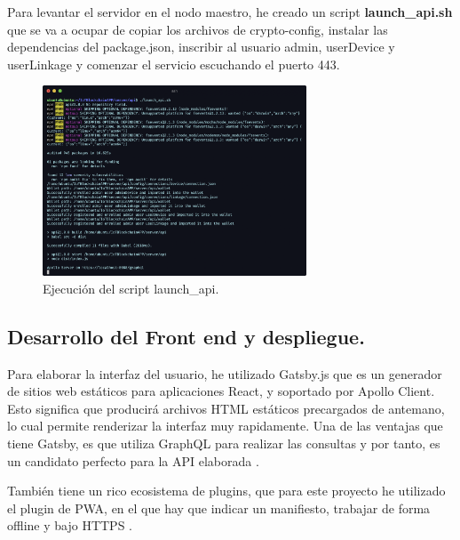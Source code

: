 \vspace{5mm}

\noindent Para levantar el servidor en el nodo maestro, he creado un script \textbf{launch\_api.sh} que se va a ocupar de 
copiar los archivos de crypto-config, instalar las dependencias del package.json, inscribir al usuario admin, userDevice y 
userLinkage y comenzar el servicio escuchando el puerto 443. 

\begin{figure}[ht!]
  \centering
  \includegraphics[width=0.7\textwidth]{imagenes/desarrollo/comandos/launch_api}
  \caption{Ejecución del script launch\_api.}
  \label{fig:launch-api}
\end{figure}

\subsection{Desarrollo del Front end y despliegue.}

Para elaborar la interfaz del usuario, he utilizado Gatsby.js que es un generador de sitios web estáticos para 
aplicaciones React, y soportado por Apollo Client. Esto significa que producirá archivos HTML estáticos precargados 
de antemano, lo cual permite renderizar la interfaz muy rapidamente. Una de las ventajas que tiene Gatsby, es que 
utiliza GraphQL para realizar las consultas y por tanto, es un candidato perfecto para la API elaborada 
\cite{react, introduction-apollo-client}.

\vspace{5mm}

\noindent También tiene un rico ecosistema de plugins, que para este proyecto he utilizado el plugin de PWA, en el que 
hay que indicar un manifiesto, trabajar de forma offline y bajo HTTPS 
\cite{progressive-web-app-gatsby, gatsby-manifest, gatsby-offline}. 

\vspace{5mm}

